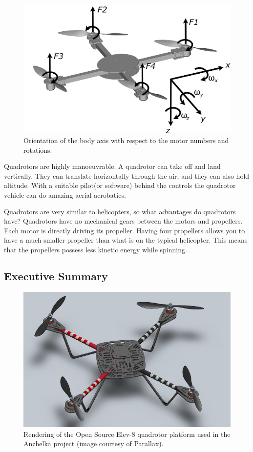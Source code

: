 \documentclass{article}
\numberwithin{equation}{section} %
\begin{document}
\begin{figure}[h!]
  \centering
	\includegraphics[scale=.05]{reference_frame_diagram.jpg}
  \caption{Orientation of the body axis with respect to the motor numbers and rotations.}
\end{figure}  

Quadrotors are highly manoeuvrable. A quadrotor can take off and land vertically. They can translate horizontally through the air, and they can also hold altitude. With a suitable pilot(or software) behind the controls the quadrotor vehicle can do amazing aerial acrobatics.

Quadrotors are very similar to helicopters, so what advantages do quadrotors have? Quadrotors have no mechanical gears between the motors and propellers. Each motor is directly driving its propeller. Having four propellers allows you to have a much smaller propeller than what is on the typical helicopter. This means that the propellers possess less kinetic energy while spinning.

\subsection{Executive Summary}
\begin{figure}[h!]
  \centering
	\includegraphics[scale=.6]{elev_8_rendering.JPG}
  \caption{Rendering of the Open Source Elev-8 quadrotor platform used in the Anzhelka project (image courtesy of Parallax).}
\end{figure}  
\end{document}
